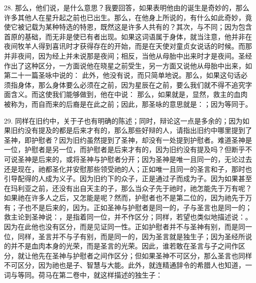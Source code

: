 28. 那么，他们说，是什么意思？我要回答，如果表明他由的诞生是奇妙的，那么许多其他人在星升起之前也已出生。那么，在他身上所说的，有什么如此奇妙，竟使它被记载为某种特选的特恩，既然这是许多人共有的？其次，与不同；因为包含首原的基础，而无非是使已有者出现。如果这词语属于身体，就当注意，他并非在夜间牧羊人得到喜讯时才获得存在的开始，而是在天使对童贞女说话的时候。而那并非夜间，因为经上并未说那是夜间；相反，当他从母胎中出来时才是夜间。圣经作出了这种区分，一方面说他在晓星之前受生，另一方面又说他从母胎中出来，如第二十一篇圣咏中说的： 此外，他没有说，而只简单地说。那么，如果这句话必须指身体，那么身体要么必须在之前，因为星辰在之前，要么我们就不得不追究字面含义。而这使我们能够做到，他在中说： 那么，如果就是，显然，救主的血肉被称为，而自而来的后裔是在此之前；因此，那圣咏的意思就是：；因为等同于。\par

29. 同样在旧约中，关于子也有明确的陈述；同时，辩论这一点是多余的；因为如果旧约没有提及的都是后来才有的，那么那些好辩的人，请指出旧约中哪里提到了圣神，即护慰者？因为旧约虽然提到了圣神，却没有一处提到护慰者。难道圣神是一位，护慰者是另一位，而护慰者是后来才有的，因为旧约没有提及吗？但断乎不可说圣神是后来的，或将圣神与护慰者分开；因为圣神是唯一且同一的，无论过去还是现在，祂都圣化并安慰那些领受祂的人；正如唯一且同一的圣言和子，那时也引导配得的人成为义子。因为旧约下的众子，正是通过子而成为子。因为如果甚至在玛利亚之前，还没有出自天主的子，那么当众子先于祂时，祂怎能先于万有呢？如果祂在许多人之后，又怎能是呢？然而，护慰者也不是第二位的，因为祂先于万有；子也不是后来的，因为。正如圣神与护慰者是同一的，子与圣言也是同一的；救主论到圣神说：，是指着同一位，并不作区分；同样，若望也类似地描述说：。因为在此他也没有区分，而是见证同一性。正如护慰者并不与圣神有别，而是同一位，同样，圣言并不与子有别，而是同一的，因为圣言就是独生子；因为圣经所说的并不是血肉本身的光荣，而是圣言的光荣。因此，谁若敢在圣言与子之间作区分，就让他先在圣神与护慰者之间作区分；但如果圣神不可区分，那么圣言也同样不可区分，因为祂也是子、智慧与大能。此外，就连精通辞令的希腊人也知道，一词与等同。荷马在第二卷中，就这样描述的独生子：\par

